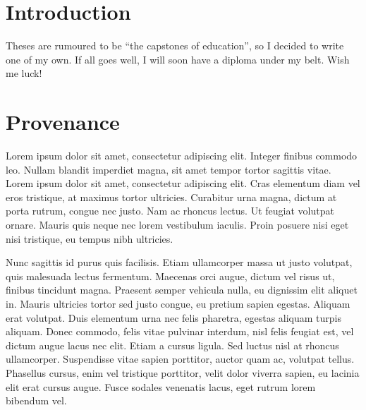 \documentclass[
  digital,     %
  oneside,     %
  nosansbold,  %
  nocolorbold, %
  lof,         %
  lot,         %
]{fithesis4}
\begin{document}
\chapter*{Introduction}

Theses are rumoured to be \enquote{the capstones of education}, so
I decided to write one of my own. If all goes well, I will soon
have a diploma under my belt. Wish me luck!

\chapter{Provenance}
\shorthandoff{-}
Lorem ipsum dolor sit amet, consectetur adipiscing elit. Integer finibus commodo leo. Nullam blandit imperdiet magna, sit amet tempor tortor sagittis vitae. Lorem ipsum dolor sit amet, consectetur adipiscing elit. Cras elementum diam vel eros tristique, at maximus tortor ultricies. Curabitur urna magna, dictum at porta rutrum, congue nec justo. Nam ac rhoncus lectus. Ut feugiat volutpat ornare. Mauris quis neque nec lorem vestibulum iaculis. Proin posuere nisi eget nisi tristique, eu tempus nibh ultricies.

Nunc sagittis id purus quis facilisis. Etiam ullamcorper massa ut justo volutpat, quis malesuada lectus fermentum. Maecenas orci augue, dictum vel risus ut, finibus tincidunt magna. Praesent semper vehicula nulla, eu dignissim elit aliquet in. Mauris ultricies tortor sed justo congue, eu pretium sapien egestas. Aliquam erat volutpat. Duis elementum urna nec felis pharetra, egestas aliquam turpis aliquam. Donec commodo, felis vitae pulvinar interdum, nisl felis feugiat est, vel dictum augue lacus nec elit. Etiam a cursus ligula. Sed luctus nisl at rhoncus ullamcorper. Suspendisse vitae sapien porttitor, auctor quam ac, volutpat tellus. Phasellus cursus, enim vel tristique porttitor, velit dolor viverra sapien, eu lacinia elit erat cursus augue. Fusce sodales venenatis lacus, eget rutrum lorem bibendum vel.
\shorthandon{-}
\end{document}
